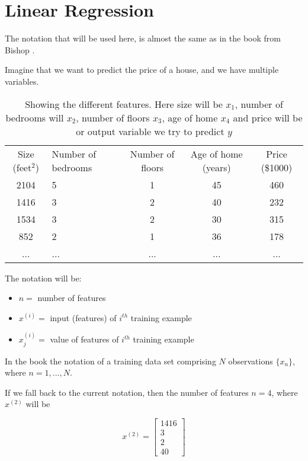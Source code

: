 \chapter{Linear Regression}

The notation that will be used here, is almost the same as in the book from Bishop \cite{bishop2006pattern}.

Imagine that we want to predict the price of a house, and we have multiple variables.

\begin{table}[H]
  \centering
  \begin{tabular}{|c|C{2.8cm}|c|c|c|}
    \hline
    Size (feet$^2$) & Number of bedrooms & Number of floors & Age of home (years) & Price (\$1000) \\
    2104 & 5 & 1 & 45 & 460 \\
    1416 & 3 & 2 & 40 & 232 \\
    1534 & 3 & 2 & 30 & 315 \\
    852 & 2 & 1 & 36 & 178 \\
    ... & ... & ... & ... & ... \\
    \hline
  \end{tabular}
  \caption{Showing the different features. Here size will be $x_1$, number of bedrooms will $x_2$, number of floors $x_3$, age of home $x_4$ and price will be or output variable we try to predict $y$}\label{tab:app:featuretable}
\end{table}

The notation will be:

\begin{itemize}
  \item $n =$ number of features
  \item $x^{(i)} =$ input (features) of $i^{th}$ training example
  \item $x^{(i)}_j =$ value of features of $i^{th}$ training example
\end{itemize}

In the book \cite{bishop2006pattern} the notation of a training data set comprising $N$ observations $\{x_n\}$, where $n = 1,...,N$.

If we fall back to the current notation, then the number of features $n=4$, where $x^{(2)}$ will be

\begin{equation}\label{eq:app:feature2}
  x^{(2)} = \left[\begin{array}{c}
                    1416 \\
                    3 \\
                    2 \\
                    40
                  \end{array}\right]
\end{equation}

